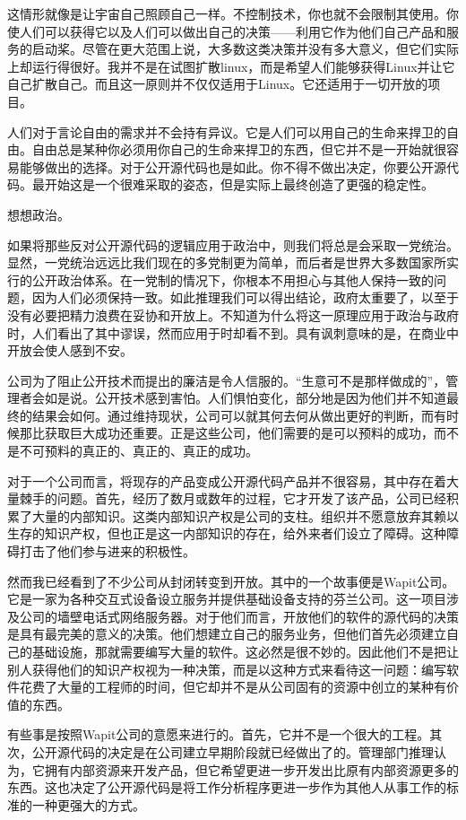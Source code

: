 这情形就像是让宇宙自己照顾自己一样。不控制技术，你也就不会限制其使用。你使人们可以获得它以及人们可以做出自己的决策——利用它作为他们自己产品和服务的启动桨。尽管在更大范围上说，大多数这类决策并没有多大意义，但它们实际上却运行得很好。我并不是在试图扩散linux，而是希望人们能够获得Linux并让它自己扩散自己。而且这一原则并不仅仅适用于Linux。它还适用于一切开放的项目。

人们对于言论自由的需求并不会持有异议。它是人们可以用自己的生命来捍卫的自由。自由总是某种你必须用你自己的生命来捍卫的东西，但它并不是一开始就很容易能够做出的选择。对于公开源代码也是如此。你不得不做出决定，你要公开源代码。最开始这是一个很难采取的姿态，但是实际上最终创造了更强的稳定性。

想想政治。

如果将那些反对公开源代码的逻辑应用于政治中，则我们将总是会采取一党统治。显然，一党统治远远比我们现在的多党制更为简单，而后者是世界大多数国家所实行的公开政治体系。在一党制的情况下，你根本不用担心与其他人保持一致的问题，因为人们必须保持一致。如此推理我们可以得出结论，政府太重要了，以至于没有必要把精力浪费在妥协和开放上。不知道为什么将这一原理应用于政治与政府时，人们看出了其中谬误，然而应用于时却看不到。具有讽刺意味的是，在商业中开放会使人感到不安。

公司为了阻止公开技术而提出的廉洁是令人信服的。“生意可不是那样做成的”，管理者会如是说。公开技术感到害怕。人们惧怕变化，部分地是因为他们并不知道最终的结果会如何。通过维持现状，公司可以就其何去何从做出更好的判断，而有时候那比获取巨大成功还重要。正是这些公司，他们需要的是可以预料的成功，而不是不可预料的真正的、真正的、真正的成功。

对于一个公司而言，将现存的产品变成公开源代码产品并不很容易，其中存在着大量棘手的问题。首先，经历了数月或数年的过程，它才开发了该产品，公司已经积累了大量的内部知识。这类内部知识产权是公司的支柱。组织并不愿意放弃其赖以生存的知识产权，但也正是这一内部知识的存在，给外来者们设立了障碍。这种障碍打击了他们参与进来的积极性。

然而我已经看到了不少公司从封闭转变到开放。其中的一个故事便是Wapit公司。它是一家为各种交互式设备设立服务并提供基础设备支持的芬兰公司。这一项目涉及公司的墙壁电话式网络服务器。对于他们而言，开放他们的软件的源代码的决策是具有最完美的意义的决策。他们想建立自己的服务业务，但他们首先必须建立自己的基础设施，那就需要编写大量的软件。这必然是很不妙的。因此他们不是把让别人获得他们的知识产权视为一种决策，而是以这种方式来看待这一问题：编写软件花费了大量的工程师的时间，但它却并不是从公司固有的资源中创立的某种有价值的东西。

有些事是按照Wapit公司的意愿来进行的。首先，它并不是一个很大的工程。其次，公开源代码的决定是在公司建立早期阶段就已经做出了的。管理部门推理认为，它拥有内部资源来开发产品，但它希望更进一步开发出比原有内部资源更多的东西。这也决定了公开源代码是将工作分析程序更进一步作为其他人从事工作的标准的一种更强大的方式。

